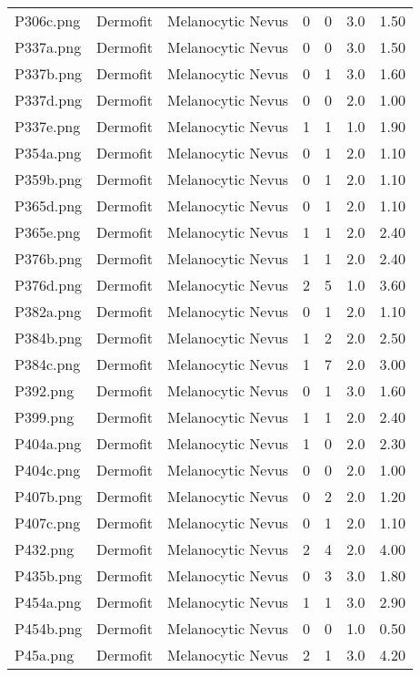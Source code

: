 \begin{longtable}{ | l | l | l | l | l | l | l |}
P306c.png & Dermofit & Melanocytic Nevus & 0 & 0 & 3.0 & 1.50 \\ 
P337a.png & Dermofit & Melanocytic Nevus & 0 & 0 & 3.0 & 1.50 \\ 
P337b.png & Dermofit & Melanocytic Nevus & 0 & 1 & 3.0 & 1.60 \\ 
P337d.png & Dermofit & Melanocytic Nevus & 0 & 0 & 2.0 & 1.00 \\ 
P337e.png & Dermofit & Melanocytic Nevus & 1 & 1 & 1.0 & 1.90 \\ 
P354a.png & Dermofit & Melanocytic Nevus & 0 & 1 & 2.0 & 1.10 \\ 
P359b.png & Dermofit & Melanocytic Nevus & 0 & 1 & 2.0 & 1.10 \\ 
P365d.png & Dermofit & Melanocytic Nevus & 0 & 1 & 2.0 & 1.10 \\ 
P365e.png & Dermofit & Melanocytic Nevus & 1 & 1 & 2.0 & 2.40 \\ 
P376b.png & Dermofit & Melanocytic Nevus & 1 & 1 & 2.0 & 2.40 \\ 
P376d.png & Dermofit & Melanocytic Nevus & 2 & 5 & 1.0 & 3.60 \\ 
P382a.png & Dermofit & Melanocytic Nevus & 0 & 1 & 2.0 & 1.10 \\ 
P384b.png & Dermofit & Melanocytic Nevus & 1 & 2 & 2.0 & 2.50 \\ 
P384c.png & Dermofit & Melanocytic Nevus & 1 & 7 & 2.0 & 3.00 \\ 
P392.png & Dermofit & Melanocytic Nevus & 0 & 1 & 3.0 & 1.60 \\ 
P399.png & Dermofit & Melanocytic Nevus & 1 & 1 & 2.0 & 2.40 \\ 
P404a.png & Dermofit & Melanocytic Nevus & 1 & 0 & 2.0 & 2.30 \\ 
P404c.png & Dermofit & Melanocytic Nevus & 0 & 0 & 2.0 & 1.00 \\ 
P407b.png & Dermofit & Melanocytic Nevus & 0 & 2 & 2.0 & 1.20 \\ 
P407c.png & Dermofit & Melanocytic Nevus & 0 & 1 & 2.0 & 1.10 \\ 
P432.png & Dermofit & Melanocytic Nevus & 2 & 4 & 2.0 & 4.00 \\ 
P435b.png & Dermofit & Melanocytic Nevus & 0 & 3 & 3.0 & 1.80 \\ 
P454a.png & Dermofit & Melanocytic Nevus & 1 & 1 & 3.0 & 2.90 \\ 
P454b.png & Dermofit & Melanocytic Nevus & 0 & 0 & 1.0 & 0.50 \\ 
P45a.png & Dermofit & Melanocytic Nevus & 2 & 1 & 3.0 & 4.20 \\ 

\end{longtable}
